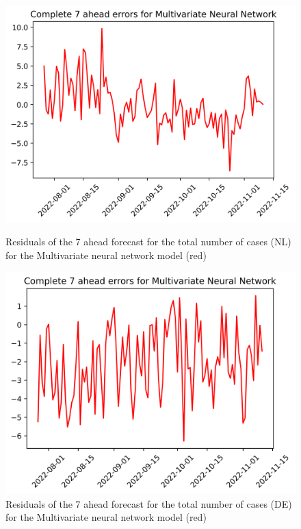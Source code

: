 \begin{figure}

\begin{minipage}{.45\textwidth}
  \centering
  \includegraphics[width=\linewidth]{pics/7_ah/7_ahead_errors_Multivariate Neural Network.png}
  \caption{Residuals of the 7 ahead forecast for the total number of cases (NL) for the Multivariate neural network model (red)}
  \label{fig:tot_cases_error_7_mvnn}
\end{minipage}
\begin{minipage}{.45\textwidth}
  \centering
  \includegraphics[width=\linewidth]{pics/7_ah/DE_7_ahead_errors_Multivariate Neural Network.png}
  \caption{Residuals of the 7 ahead forecast for the total number of cases (DE) for the Multivariate neural network model (red)}
  \label{fig:tot_cases_error_7_mvnn_DE}
\end{minipage}

\end{figure}
